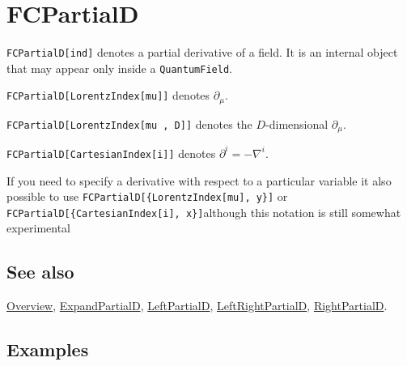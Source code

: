 \documentclass[../FeynCalcManual.tex]{subfiles}
\begin{document}
\hypertarget{fcpartiald}{
\section{FCPartialD}\label{fcpartiald}}

\texttt{FCPartialD[\allowbreak{}ind]} denotes a partial derivative of a
field. It is an internal object that may appear only inside a
\texttt{QuantumField}.

\texttt{FCPartialD[\allowbreak{}LorentzIndex[\allowbreak{}mu]]} denotes
\(\partial_{\mu }\).

\texttt{FCPartialD[\allowbreak{}LorentzIndex[\allowbreak{}mu ,\ \allowbreak{}D]]}
denotes the \(D\)-dimensional \(\partial_{\mu }\).

\texttt{FCPartialD[\allowbreak{}CartesianIndex[\allowbreak{}i]]} denotes
\(\partial^{i} = - \nabla^i\).

If you need to specify a derivative with respect to a particular
variable it also possible to use
\texttt{FCPartialD[\allowbreak{}\{\allowbreak{}LorentzIndex[\allowbreak{}mu],\ \allowbreak{}y\}]}
or
\texttt{FCPartialD[\allowbreak{}\{\allowbreak{}CartesianIndex[\allowbreak{}i],\ \allowbreak{}x\}]}although
this notation is still somewhat experimental

\subsection{See also}

\hyperlink{toc}{Overview}, \hyperlink{expandpartiald}{ExpandPartialD},
\hyperlink{leftpartiald}{LeftPartialD},
\hyperlink{leftrightpartiald}{LeftRightPartialD},
\hyperlink{rightpartiald}{RightPartialD}.

\subsection{Examples}

\begin{Shaded}
\begin{Highlighting}[]
\OperatorTok{[}\OperatorTok{,} \OperatorTok{\{}\SpecialCharTok{\textbackslash{}}\OperatorTok{[}\OperatorTok{]\}]}\OperatorTok{[}\SpecialCharTok{\textbackslash{}}\OperatorTok{[}\OperatorTok{]]} 
 
\ExtensionTok{=}\OperatorTok{[}\SpecialCharTok{\%}\OperatorTok{]}
\end{Highlighting}
\end{Shaded}
\end{document}
